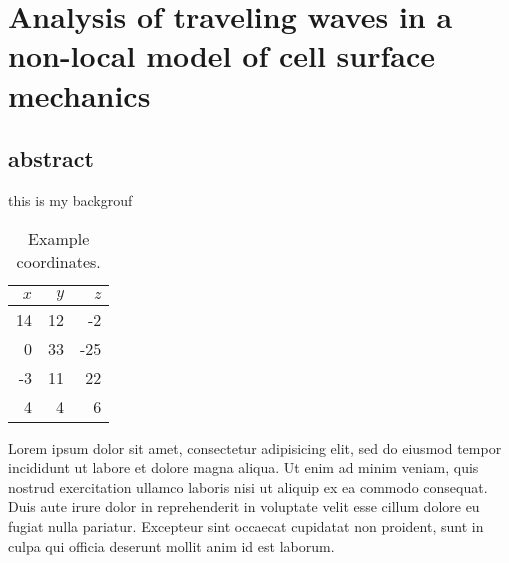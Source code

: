 \chapter{Analysis of traveling waves in a non-local model of cell surface mechanics}

\section*{abstract}

this is my backgrouf

\begin{table}
  \centering
  \begin{tabular}{|rr|r|}
    \hline
    $x$ & $y$ & $z$ \\
    \hline
    14 & 12 & -2 \\
    0 & 33 & -25 \\
    -3 & 11 & 22 \\
    4 & 4 & 6 \\
    \hline
  \end{tabular}
  \caption{Example coordinates.}
  \label{tab:coordinates}
\end{table}

Lorem ipsum dolor sit amet, consectetur adipisicing elit, sed do
eiusmod tempor incididunt ut labore et dolore magna aliqua. Ut enim ad
minim veniam, quis nostrud exercitation ullamco laboris nisi ut
aliquip ex ea commodo consequat. Duis aute irure dolor in
reprehenderit in voluptate velit esse cillum dolore eu fugiat nulla
pariatur. Excepteur sint occaecat cupidatat non proident, sunt in
culpa qui officia deserunt mollit anim id est laborum.
